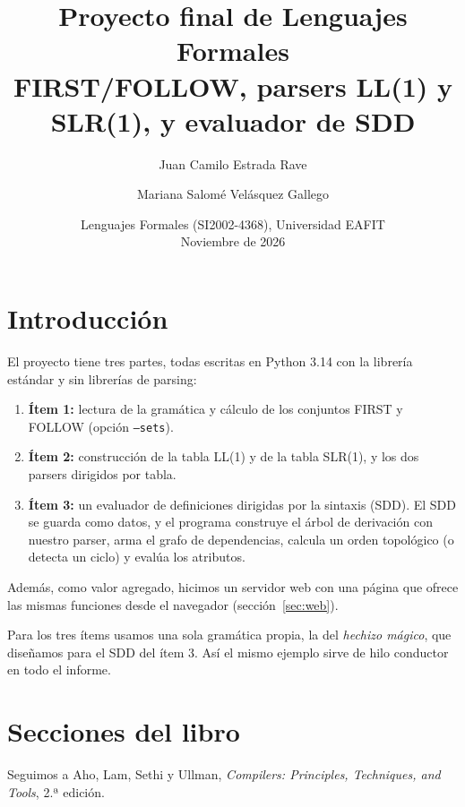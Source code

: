 \documentclass[11pt,a4paper]{article}
\title{Proyecto final de Lenguajes Formales\\[0.3em]
\large FIRST/FOLLOW, parsers LL(1) y SLR(1), y evaluador de SDD}
\author{Juan Camilo Estrada Rave \and Mariana Salomé Velásquez Gallego}
\date{Lenguajes Formales (SI2002-4368), Universidad EAFIT\\Noviembre de 2026}
\newcommand{\code}[1]{\texttt{#1}}
\begin{document}
\maketitle

\section{Introducción}

El proyecto tiene tres partes, todas escritas en Python 3.14 con la librería estándar y sin librerías de parsing:

\begin{enumerate}
  \item \textbf{Ítem 1:} lectura de la gramática y cálculo de los conjuntos FIRST y FOLLOW (opción \code{--sets}).
  \item \textbf{Ítem 2:} construcción de la tabla LL(1) y de la tabla SLR(1), y los dos parsers dirigidos por tabla.
  \item \textbf{Ítem 3:} un evaluador de definiciones dirigidas por la sintaxis (SDD). El SDD se guarda como datos, y el programa construye el árbol de derivación con nuestro parser, arma el grafo de dependencias, calcula un orden topológico (o detecta un ciclo) y evalúa los atributos.
\end{enumerate}

Además, como valor agregado, hicimos un servidor web con una página que ofrece las mismas funciones desde el navegador (sección~\ref{sec:web}).

Para los tres ítems usamos una sola gramática propia, la del \emph{hechizo mágico}, que diseñamos para el SDD del ítem 3. Así el mismo ejemplo sirve de hilo conductor en todo el informe.

\section{Secciones del libro}

Seguimos a Aho, Lam, Sethi y Ullman, \emph{Compilers: Principles, Techniques, and Tools}, 2.ª edición.
\end{document}

